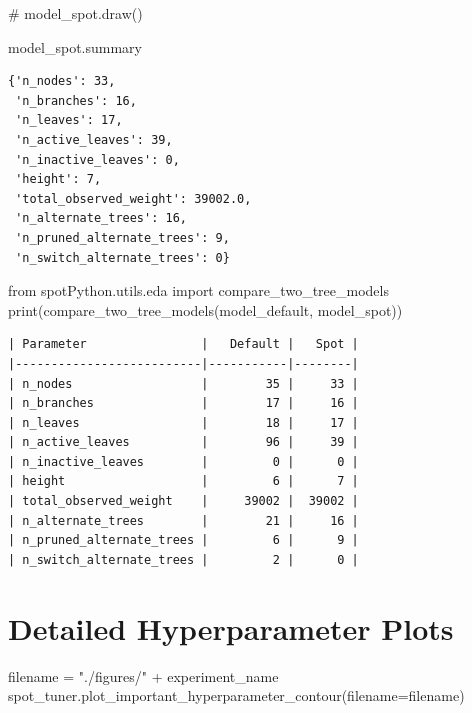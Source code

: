 \documentclass[
  letterpaper,
  DIV=11,
  numbers=noendperiod]{scrreprt}
\newenvironment{Shaded}{\begin{snugshade}}{\end{snugshade}}
\newcommand{\BuiltInTok}[1]{\textcolor[rgb]{0.00,0.23,0.31}{#1}}
\newcommand{\CommentTok}[1]{\textcolor[rgb]{0.37,0.37,0.37}{#1}}
\newcommand{\ImportTok}[1]{\textcolor[rgb]{0.00,0.46,0.62}{#1}}
\newcommand{\NormalTok}[1]{\textcolor[rgb]{0.00,0.23,0.31}{#1}}
\newcommand{\OperatorTok}[1]{\textcolor[rgb]{0.37,0.37,0.37}{#1}}
\newcommand{\StringTok}[1]{\textcolor[rgb]{0.13,0.47,0.30}{#1}}
\begin{document}
\begin{Shaded}
\begin{Highlighting}[]
\CommentTok{\# model\_spot.draw()}
\end{Highlighting}
\end{Shaded}

\begin{Shaded}
\begin{Highlighting}[]
\NormalTok{model\_spot.summary}
\end{Highlighting}
\end{Shaded}

\begin{verbatim}
{'n_nodes': 33,
 'n_branches': 16,
 'n_leaves': 17,
 'n_active_leaves': 39,
 'n_inactive_leaves': 0,
 'height': 7,
 'total_observed_weight': 39002.0,
 'n_alternate_trees': 16,
 'n_pruned_alternate_trees': 9,
 'n_switch_alternate_trees': 0}
\end{verbatim}

\begin{Shaded}
\begin{Highlighting}[]
\ImportTok{from}\NormalTok{ spotPython.utils.eda }\ImportTok{import}\NormalTok{ compare\_two\_tree\_models}
\BuiltInTok{print}\NormalTok{(compare\_two\_tree\_models(model\_default, model\_spot))}
\end{Highlighting}
\end{Shaded}

\begin{verbatim}
| Parameter                |   Default |   Spot |
|--------------------------|-----------|--------|
| n_nodes                  |        35 |     33 |
| n_branches               |        17 |     16 |
| n_leaves                 |        18 |     17 |
| n_active_leaves          |        96 |     39 |
| n_inactive_leaves        |         0 |      0 |
| height                   |         6 |      7 |
| total_observed_weight    |     39002 |  39002 |
| n_alternate_trees        |        21 |     16 |
| n_pruned_alternate_trees |         6 |      9 |
| n_switch_alternate_trees |         2 |      0 |
\end{verbatim}

\section{Detailed Hyperparameter
Plots}\label{detailed-hyperparameter-plots}

\begin{Shaded}
\begin{Highlighting}[]
\NormalTok{filename }\OperatorTok{=} \StringTok{"./figures/"} \OperatorTok{+}\NormalTok{ experiment\_name}
\NormalTok{spot\_tuner.plot\_important\_hyperparameter\_contour(filename}\OperatorTok{=}\NormalTok{filename)}
\end{Highlighting}
\end{Shaded}
\end{document}
